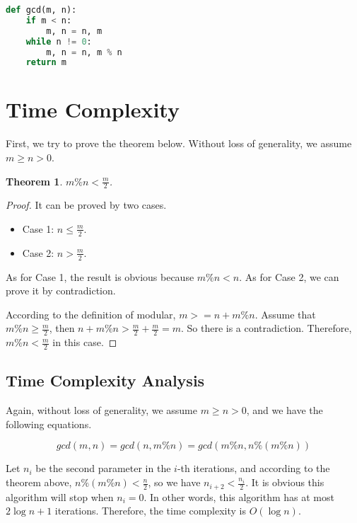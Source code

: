 \documentclass{article}
\theoremstyle{plain}
\newtheorem*{theorem*}{Theorem}
\newenvironment{file}[1][File]{ %
	\medskip
	\newcommand{\mdfilename}{#1}
	\begin{mdframed}[style=file]
		}{
	\end{mdframed}
	\medskip
}
\begin{document}
\begin{file}[gcd.py]
	\begin{lstlisting}[language=Python]
def gcd(m, n):
    if m < n:
        m, n = n, m
    while n != 0:
        m, n = n, m % n
    return m
\end{lstlisting}
\end{file}

\section{Time Complexity}

First, we try to prove the theorem below. Without loss of generality, we assume $m \geq n > 0$.

\begin{theorem*}
	$m \% n < \frac{m}{2}$.
\end{theorem*}
\begin{proof}
	It can be proved by two cases.

	\begin{itemize}
		\item Case 1: $n \leq \frac{m}{2}$.
		\item Case 2: $n > \frac{m}{2}$.
	\end{itemize}

	As for Case 1, the result is obvious because $m \% n < n$. As for Case 2, we can prove it by contradiction.

	According to the definition of modular, $m >= n + m \% n$. Assume that $m \% n \geq \frac{m}{2}$, then $n + m \% n > \frac{m}{2} + \frac{m}{2} = m$. So there is a contradiction. Therefore, $m \% n < \frac{m}{2}$ in this case.
\end{proof}

\subsection{Time Complexity Analysis}
Again, without loss of generality, we assume $m \geq n > 0$, and we have the following equations.

\[gcd(m, n) = gcd(n, m\%n) = gcd(m\%n, n\%(m\%n))\]

Let $n_i$ be the second parameter in the $i$-th iterations, and according to the theorem above, $n \% (m\%n) < \frac{n}{2}$, so we have $n_{i+2} < \frac{n_i}{2}$. It is obvious this algorithm will stop when $n_i = 0$. In other words, this algorithm has at most $2\log{n} + 1$ iterations. Therefore, the time complexity is $O(\log{n})$.
\end{document}
